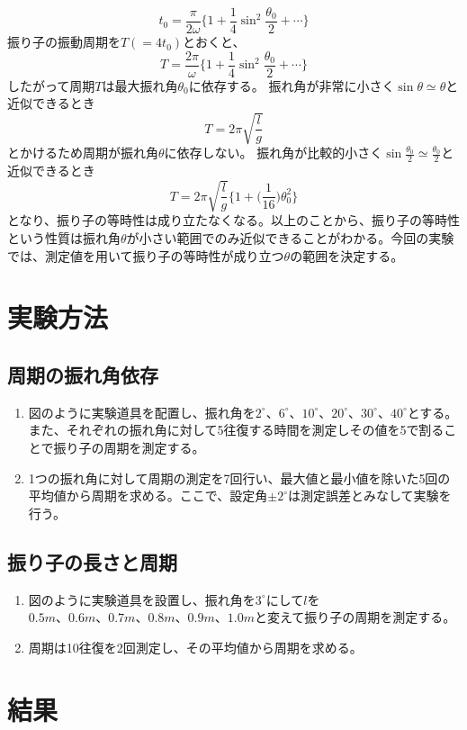 \documentclass{jlreq}
\begin{document}
  \[t_0=\frac{\pi}{2\omega}\Big\{1+\frac{1}{4}\sin^2 \frac{\theta_0}{2}+\cdots\Big\}\]
  振り子の振動周期を$T(=4t_0)$とおくと、
  \[T=\frac{2\pi}{\omega}\Big\{1+\frac{1}{4}\sin^2 \frac{\theta_0}{2}+\cdots\Big\}\]
  したがって周期$T$は最大振れ角$\theta_0$に依存する。
  振れ角が非常に小さく$\sin \theta  \simeq \theta$と近似できるとき
  \[T=2\pi\sqrt{\frac{l}{g}}\]
  とかけるため周期が振れ角$\theta$に依存しない。
  振れ角が比較的小さく$\sin \frac{\theta_0}{2}  \simeq \frac{\theta_0}{2}$と近似できるとき
  \[T=2\pi\sqrt{\frac{l}{g}}\Big\{1+\Big(\frac{1}{16}\Big)\theta_0^2\Big\}\]
  となり、振り子の等時性は成り立たなくなる。以上のことから、振り子の等時性という性質は振れ角$\theta$が小さい範囲でのみ近似できることがわかる。今回の実験では、測定値を用いて振り子の等時性が成り立つ$\theta$の範囲を決定する。
  
  \section{実験方法}
  \subsection{周期の振れ角依存}
  \begin{enumerate}
    \item 図のように実験道具を配置し、振れ角を$2^\circ、6^\circ、10^\circ、20^\circ、30^\circ、40^\circ$とする。また、それぞれの振れ角に対して5往復する時間を測定しその値を5で割ることで振り子の周期を測定する。
    \item 1つの振れ角に対して周期の測定を7回行い、最大値と最小値を除いた5回の平均値から周期を求める。ここで、設定角$\pm2^\circ$は測定誤差とみなして実験を行う。
  \end{enumerate}

  \subsection{振り子の長さと周期}
  \begin{enumerate}
    \item 図のように実験道具を設置し、振れ角を$3^\circ$にして$l$を$0.5m、0.6m、0.7m、0.8m、0.9m、1.0m$と変えて振り子の周期を測定する。
    \item 周期は10往復を2回測定し、その平均値から周期を求める。
  \end{enumerate}
  
  \section{結果}
\end{document}
